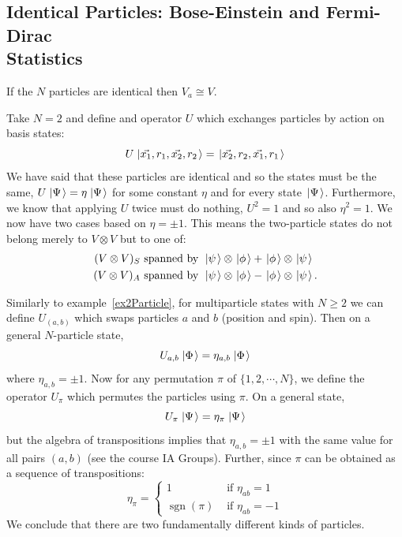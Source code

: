 \documentclass[../Main.tex]{subfiles}
\begin{document}
\subsection{Identical Particles: Bose-Einstein and Fermi-Dirac\texorpdfstring{\\}{ }Statistics}
If the $N$ particles are identical then $V_a \cong V$.
\begin{example}[2 particles]
    \label{ex2Particle}
    Take $N = 2$ and define and operator $U$ which exchanges particles by action on basis states:
    \begin{equation*}
        U\left.\left|\vec{x_1}, r_1, \vec{x_2}, r_2\right.\right\rangle = \left.\left|\vec{x_2}, r_2, \vec{x_1}, r_1\right.\right\rangle
    \end{equation*}
    We have said that these particles are identical and so the states must be the same, $U\left.\left|\Psi\right.\right\rangle = \eta \left.\left|\Psi\right.\right\rangle$ for some constant $\eta$ and for every state $\left.\left|\Psi\right.\right\rangle$. Furthermore, we know that applying $U$ twice must do nothing, $U^2 = 1$ and so also $\eta^2 = 1$. We now have two cases based on $\eta = \pm 1$. This means the two-particle states do not belong merely to $V\otimes V$ but to one of:
    \begin{align*}
        (V \otimes V)_S &\text{ spanned by } \left.\left|\psi\right.\right\rangle \otimes \left.\left|\phi\right.\right\rangle + \left.\left|\phi\right.\right\rangle \otimes \left.\left|\psi\right.\right\rangle \\
        (V \otimes V)_A &\text{ spanned by } \left.\left|\psi\right.\right\rangle \otimes \left.\left|\phi\right.\right\rangle - \left.\left|\phi\right.\right\rangle \otimes \left.\left|\psi\right.\right\rangle.
    \end{align*}
\end{example}
Similarly to example~\ref{ex2Particle}, for multiparticle states with $N \geq 2$ we can define $U_(a, b)$ which swaps particles $a$ and $b$ (position and spin). Then on a general $N$-particle state,
\begin{equation*}
    U_{a, b}\left.\left|\Phi\right.\right\rangle = \eta_{a, b}\left.\left|\Phi\right.\right\rangle
\end{equation*}
where $\eta_{a, b} = \pm 1$. Now for any permutation $\pi$ of $\{1, 2, \cdots, N\}$, we define the operator $U_\pi$ which permutes the particles using $\pi$. On a general state,
\begin{equation*}
    U_\pi \left.\left|\Psi\right.\right\rangle = \eta_\pi \left.\left|\Psi\right.\right\rangle
\end{equation*}
but the algebra of transpositions implies that $\eta_{a, b} = \pm 1$ with the same value for all pairs $(a, b)$ (see the course IA Groups). Further, since $\pi$ can be obtained as a sequence of transpositions:
\begin{equation*}
    \eta_\pi = 
    \begin{cases}
        1 & \text{ if } \eta_{ab} = 1 \\
        \operatorname{sgn}(\pi) & \text{ if } \eta_{ab} = -1
    \end{cases}
\end{equation*}
We conclude that there are two fundamentally different kinds of particles.
\end{document}

